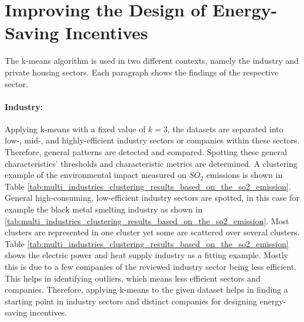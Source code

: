 \newpage

\section{Improving the Design of Energy-Saving Incentives}
\label{sec:improving_the_design_of_energy_saving_incentives}
The k-means algorithm is used in two different contexts, namely the industry and private housing sectors.
Each paragraph shows the findings of the respective sector.
\paragraph*{Industry:}
Applying k-means with a fixed value of $k=3$, the datasets are separated into low-, mid-, and highly-efficient industry sectors or companies within these sectors.
Therefore, general patterns are detected and compared.
Spotting these general characteristics' thresholds and characteristic metrics are determined.
A clustering example of the environmental impact measured on $SO_2$ emissions is shown in Table \ref{tab:multi_industries_clustering_results_based_on_the_so2_emission}.
General high-consuming, low-efficient industry sectors are spotted, in this case for example the black metal smelting industry as shown in \ref{tab:multi_industries_clustering_results_based_on_the_so2_emission}.
Most clusters are represented in one cluster yet some are scattered over several clusters.
Table \ref{tab:multi_industries_clustering_results_based_on_the_so2_emission} shows the electric power and heat supply industry as a fitting example.
Mostly this is due to a few companies of the reviewed industry sector being less efficient.
This helps in identifying outliers, which means less efficient sectors and companies.
Therefore, applying k-means to the given dataset helps in finding a starting point in industry sectors and distinct companies for designing energy-saving incentives.

